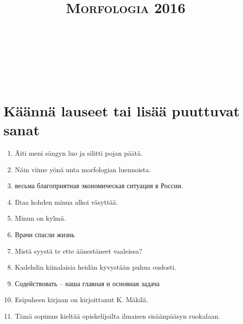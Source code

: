 \documentclass[paper=a4, fontsize=11pt]{scrartcl}
\title{	
\normalfont \normalsize 
\textsc{Morfologia 2016} \\ [25pt] 
\horrule{0.5pt} \\[0.4cm] 
\huge  \\ 
\horrule{2pt} \\[0.5cm] 
}
\date{}
\begin{document}
\onehalfspacing

\section{Käännä lauseet tai lisää puuttuvat sanat}

\begin{enumerate}
    \item Äiti meni sängyn luo ja silitti pojan päätä. \\
    \underline{\hspace{12cm}}
    \item Näin viime yönä unta morfologian luennoista. \\
    \underline{\hspace{12cm}}
    \item  {} весьма благоприятная экономическая ситуация в России.
    \item Iltaa kohden minua alkoi väsyttää. \\
    \underline{\hspace{12cm}}
    \item Minun on kylmä. \\
    \underline{\hspace{12cm}}
    \item  Врачи спасли \raisebox{-\baselineskip}{\shortstack{\underline{\hspace{3cm}}\\lapsi}} жизнь
    \item Mistä syystä te ette äänestäneet vaaleissa? \\
    \underline{\hspace{12cm}}
    \item Kadehdin kiinalaisia heidän kyvystään puhua oudosti. \\
    \underline{\hspace{12cm}}
    \item  Содействовать   -- наша главная и основная задача
    \item Esipuheen kirjaan on kirjoittanut K. Mäkilä. \\
    \underline{\hspace{12cm}}
    \item Tämä sopimus kieltää opiskelijoilta ilmaisen sisäänpääsyn ruokalaan. \\

\end{enumerate}
\end{document}

